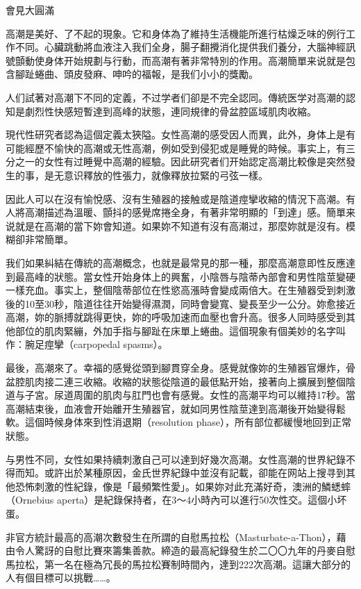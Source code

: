 \documentclass[12pt,UTF8]{ctexbook}
\begin{document}
會見大圓滿




高潮是美好、了不起的現象。它和身体為了維持生活機能所進行枯燥乏味的例行工作不同。心臟跳動將血液注入我们全身，腸子翻攪消化提供我们養分，大腦神經訊號顫動使身体开始規劃与行動，而高潮有著非常特別的作用。高潮簡單来说就是包含腳趾蜷曲、頭皮發麻、呻吟的福報，是我们小小的獎勵。

人们試著对高潮下不同的定義，不过学者们卻是不完全認同。傳統医学对高潮的認知是劇烈性快感短暫達到高峰的狀態，連同規律的骨盆腔區域肌肉收縮。

現代性研究者認為這個定義太狹隘。女性高潮的感受因人而異，此外，身体上是有可能經歷不愉快的高潮或无性高潮，例如受到侵犯或是睡覺的時候。事实上，有三分之一的女性有过睡覺中高潮的經驗。因此研究者们开始認定高潮比較像是突然發生的事，是无意识釋放的性張力，就像釋放拉緊的弓弦一樣。

因此人可以在沒有愉悅感、沒有生殖器的接触或是陰道痙攣收縮的情況下高潮。有人將高潮描述為溫暖、顫抖的感覺席捲全身，有著非常明顯的「到達」感。簡單来说就是在高潮的當下妳會知道。如果妳不知道有沒有高潮过，那麼妳就是沒有。模糊卻非常簡單。

我们如果糾結在傳統的高潮概念，也就是最常見的那一種，那麼高潮意即性反應達到最高峰的狀態。當女性开始身体上的興奮，小陰唇与陰蒂內部會和男性陰莖變硬一樣充血。事实上，整個陰蒂部位在性慾高漲時會變成兩倍大。在生殖器受到刺激後的10至30秒，陰道往往开始變得濕潤，同時會變寬、變長至少一公分。妳愈接近高潮，妳的脈搏就跳得更快，妳的呼吸加速而血壓也會升高。很多人同時感受到其他部位的肌肉緊繃，外加手指与腳趾在床單上蜷曲。這個現象有個美妙的名字叫作：腕足痙攣（carpopedal spasms）。

最後，高潮來了。幸福的感覺從頭到腳貫穿全身。感覺就像妳的生殖器官爆炸，骨盆腔肌肉接二連三收縮。收縮的狀態從陰道的最低點开始，接著向上擴展到整個陰道与子宮。尿道周圍的肌肉与肛門也會有感覺。女性的高潮平均可以維持17秒。當高潮結束後，血液會开始離开生殖器官，就如同男性陰莖達到高潮後开始變得鬆軟。這個時候身体來到性消退期（resolution phase），所有部位都緩慢地回到正常狀態。

与男性不同，女性如果持續刺激自己可以達到好幾次高潮。女性高潮的世界紀錄不得而知。或許出於某種原因，金氏世界紀錄中並沒有記載，卻能在网站上搜寻到其他恐怖刺激的性紀錄，像是「最頻繁性愛」。如果妳对此充滿好奇，澳洲的鱗蟋蟀（Ornebius aperta）是紀錄保持者，在3〜4小時內可以進行50次性交。這個小坏蛋。

非官方統計最高的高潮次數發生在所謂的自慰馬拉松（Masturbate-a-Thon），藉由令人驚訝的自慰比賽來籌集善款。締造的最高紀錄發生於二〇〇九年的丹麥自慰馬拉松，第一名在極為冗長的馬拉松賽制時間內，達到222次高潮。這讓大部分的人有個目標可以挑戰……。
\end{document}
